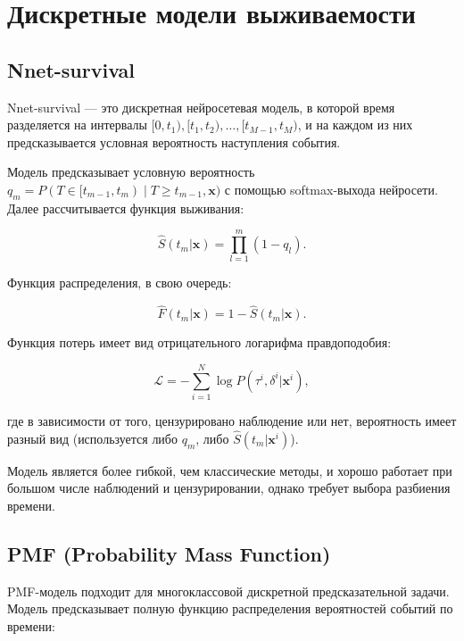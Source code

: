 \documentclass[a4paper,14pt,oneside,openany]{memoir}
\begin{document}
\section{Дискретные модели выживаемости}

\subsection{Nnet-survival}

Nnet-survival \cite{Gensheimer2019} — это дискретная нейросетевая модель, в которой время разделяется на интервалы $[0, t_1), [t_1, t_2), \dots, [t_{M-1}, t_M)$, и на каждом из них предсказывается условная вероятность наступления события.

Модель предсказывает условную вероятность $q_m = P(T \in [t_{m-1}, t_m) \mid T \geq t_{m-1}, \mathbf{x})$ с помощью softmax-выхода нейросети. Далее рассчитывается функция выживания:

\begin{equation}
	\hat{S}(t_m|\mathbf{x}) = \prod_{l=1}^{m} (1 - q_l).
\end{equation}

Функция распределения, в свою очередь:

\begin{equation}
	\hat{F}(t_m|\mathbf{x}) = 1 - \hat{S}(t_m|\mathbf{x}).
\end{equation}

Функция потерь имеет вид отрицательного логарифма правдоподобия:

\begin{equation}
	\mathcal{L} = -\sum_{i=1}^N \log P(\tau^i, \delta^i|\mathbf{x}^i),
\end{equation}

где в зависимости от того, цензурировано наблюдение или нет, вероятность имеет разный вид (используется либо $q_m$, либо $\hat{S}(t_m|\mathbf{x}^i)$).

Модель является более гибкой, чем классические методы, и хорошо работает при большом числе наблюдений и цензурировании, однако требует выбора разбиения времени.

\subsection{PMF (Probability Mass Function)}

PMF-модель  подходит для многоклассовой дискретной предсказательной задачи. Модель предсказывает полную функцию распределения вероятностей событий по времени:
\end{document}
